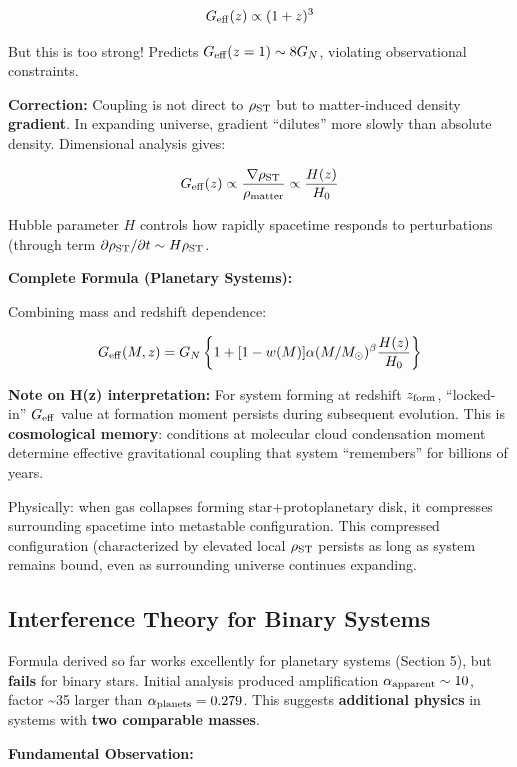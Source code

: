 \documentclass[10pt,a4paper]{article}
\begin{document}
\[G_{\rm eff}(z) \propto (1+z)^3\]

But this is too strong! Predicts \(G_{\rm eff}(z=1) \sim 8 G_N\),
violating observational constraints.

\textbf{Correction:} Coupling is not direct to \(\rho_{\rm ST}\) but to
matter-induced density \textbf{gradient}. In expanding universe,
gradient ``dilutes'' more slowly than absolute density. Dimensional
analysis gives:

\[G_{\rm eff}(z) \propto \frac{\nabla \rho_{\rm ST}}{\rho_{\rm matter}} \propto \frac{H(z)}{H_0}\]

Hubble parameter \(H\) controls how rapidly spacetime responds to
perturbations (through term
\(\partial \rho_{\rm ST}/\partial t \sim H \rho_{\rm ST}\).

\textbf{Complete Formula (Planetary Systems):}

Combining mass and redshift dependence:

\[G_{\rm eff}(M,z) = G_N \left\{1 + [1-w(M)] \alpha (M/M_\odot)^\beta \frac{H(z)}{H_0}\right\}\]

\textbf{Note on H(z) interpretation:} For system forming at redshift
\(z_{\rm form}\), ``locked-in'' \(G_{\rm eff}\) value at formation
moment persists during subsequent evolution. This is
\textbf{cosmological memory}: conditions at molecular cloud condensation
moment determine effective gravitational coupling that system
``remembers'' for billions of years.

Physically: when gas collapses forming star+protoplanetary disk, it
compresses surrounding spacetime into metastable configuration. This
compressed configuration (characterized by elevated local
\(\rho_{\rm ST}\) persists as long as system remains bound, even as
surrounding universe continues expanding.

\subsection{Interference Theory for Binary
Systems}\label{interference-theory-for-binary-systems}

Formula derived so far works excellently for planetary systems (Section
5), but \textbf{fails} for binary stars. Initial analysis produced
amplification \(\alpha_{\rm apparent} \sim 10\), factor
\textasciitilde35 larger than \(\alpha_{\rm planets} = 0.279\). This
suggests \textbf{additional physics} in systems with \textbf{two
comparable masses}.

\textbf{Fundamental Observation:}
\end{document}
